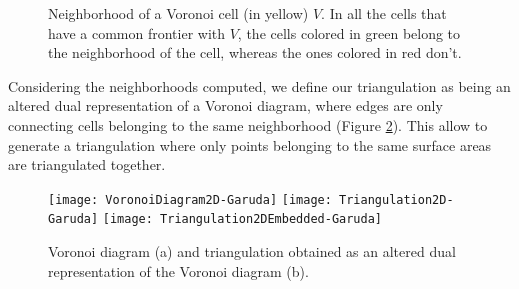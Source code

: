 \documentclass[11pt,fleqn]{book} %
\begin{document}
\begin{figure}[ht]
\centering
{}
\caption{Neighborhood of a Voronoi cell (in yellow) $V$. In all the cells that have a common frontier with $V$, the cells colored in green belong to the neighborhood of the cell, whereas the ones colored in red don't.}
\label{fig:voronoi_cell_neighborhood}
\end{figure}

Considering the neighborhoods computed, we define our triangulation as being an altered dual representation of a Voronoi diagram, where edges are only connecting cells belonging to the same neighborhood (Figure \ref{fig:voronoi_diagram_triangulation}).
This allow to generate a triangulation where only points belonging to the same surface areas are triangulated together.

\begin{figure}[ht]
\centering\texttt{[image: VoronoiDiagram2D-Garuda]}
\centering\texttt{[image: Triangulation2D-Garuda]}
\centering\texttt{[image: Triangulation2DEmbedded-Garuda]}
\caption{Voronoi diagram (a) and triangulation obtained as an altered dual representation of the Voronoi diagram (b).}
\label{fig:voronoi_diagram_triangulation}
\end{figure}
\end{document}
